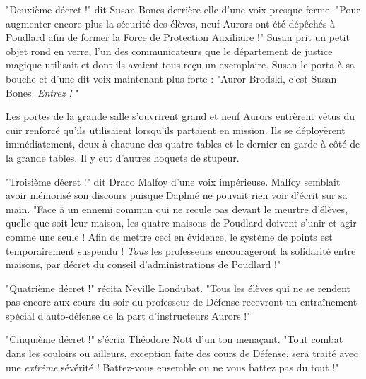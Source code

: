 "Deuxième décret !" dit Susan Bones derrière elle d'une voix presque ferme. "Pour augmenter encore plus la sécurité des élèves, neuf Aurors ont été dépêchés à Poudlard afin de former la Force de Protection Auxiliaire !" Susan prit un petit objet rond en verre, l'un des communicateurs que le département de justice magique utilisait et dont ils avaient tous reçu un exemplaire. Susan le porta à sa bouche et d'une dit voix maintenant plus forte : "Auror Brodski, c'est Susan Bones. \emph{Entrez !} "

Les portes de la grande salle s'ouvrirent grand et neuf Aurors entrèrent vêtus du cuir renforcé qu'ils utilisaient lorsqu'ils partaient en mission. Ils se déployèrent immédiatement, deux à chacune des quatre tables et le dernier en garde à côté de la grande tables. Il y eut d'autres hoquets de stupeur.

"Troisième décret !" dit Draco Malfoy d'une voix impérieuse. Malfoy semblait avoir mémorisé son discours puisque Daphné ne pouvait rien voir d'écrit sur sa main. "Face à un ennemi commun qui ne recule pas devant le meurtre d'élèves, quelle que soit leur maison, les quatre maisons de Poudlard doivent s'unir et agir comme une seule ! Afin de mettre ceci en évidence, le système de points est temporairement suspendu ! \emph{Tous}  les professeurs encourageront la solidarité entre maisons, par décret du conseil d'administrations de Poudlard !"

"Quatrième décret !" récita Neville Londubat. "Tous les élèves qui ne se rendent pas encore aux cours du soir du professeur de Défense recevront un entraînement spécial d'auto-défense de la part d'instructeurs Aurors !"

"Cinquième décret !" s'écria Théodore Nott d'un ton menaçant. "Tout combat dans les couloirs ou ailleurs, exception faite des cours de Défense, sera traité avec une \emph{extrême}  sévérité ! Battez-vous ensemble ou ne vous battez pas du tout !"

